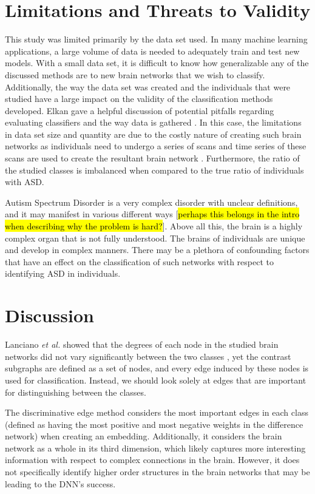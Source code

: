 \documentclass[sigconf]{acmart}
\begin{document}
\section{Limitations and Threats to Validity} \label{limitations}

This study was limited primarily by the data set used.
In many machine learning applications, a large volume of data is needed to adequately train and test new models.
With a small data set, it is difficult to know how generalizable any of the discussed methods are to new brain networks that we wish to classify.
Additionally, the way the data set was created and the individuals that were studied have a large impact on the validity of the classification methods developed.
Elkan gave a helpful discussion of potential pitfalls regarding evaluating classifiers and the way data is gathered \cite{elkan2012}.
In this case, the limitations in data set size and quantity are due to the costly nature of creating such brain networks as individuals need to undergo a series of scans and time series of these scans are used to create the resultant brain network \cite{lanciano2020}.
Furthermore, the ratio of the studied classes is imbalanced when compared to the true ratio of individuals with ASD.

Autism Spectrum Disorder is a very complex disorder with unclear definitions, and it may manifest in various different ways [\hl{perhaps this belongs in the intro when describing why the problem is hard?}].
Above all this, the brain is a highly complex organ that is not fully understood.
The brains of individuals are unique and develop in complex manners.
There may be a plethora of confounding factors that have an effect on the classification of such networks with respect to identifying ASD in individuals.

\section{Discussion} \label{discussion}

Lanciano \emph{et al.} showed that the degrees of each node in the studied brain networks did not vary significantly between the two classes \cite{lanciano2020},
yet the contrast subgraphs are defined as a set of nodes, and every edge induced by these nodes is used for classification.
Instead, we should look solely at edges that are important for distinguishing between the classes.

The discriminative edge method considers the most important edges in each class (defined as having the most positive and most negative weights in the difference network) when creating an embedding.
Additionally, it considers the brain network as a whole in its third dimension, which likely captures more interesting information with respect to complex connections in the brain.
However, it does not specifically identify higher order structures in the brain networks that may be leading to the DNN's success.
\end{document}
